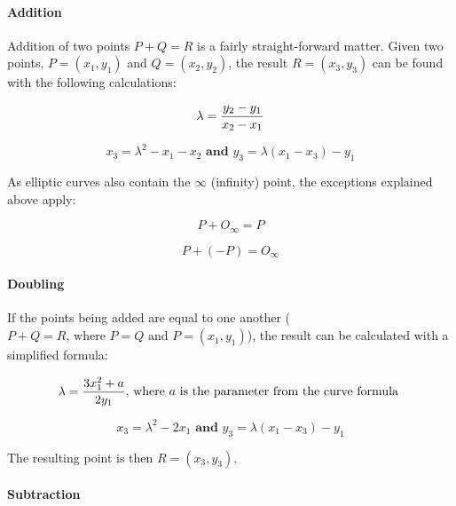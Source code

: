 \paragraph{Addition}

Addition of two points \(P + Q = R\) is a fairly straight-forward matter. Given two points, \(P = (x_1,y_1)\) and
\(Q = (x_2,y_2)\), the result \(R = (x_3,y_3)\) can be found with the following calculations:

\begin{equation}
	\lambda = {{y_2-y_1} \over {x_2-x_1}}
\end{equation}

\begin{equation}
	x_3 = \lambda^2 - x_1 - x_2 \textbf{ and } y_3 = \lambda (x_1 - x_3) - y_1
\end{equation}

As elliptic curves also contain the \(\infty\) (infinity) point, the exceptions explained above apply:

\begin{equation}
	P + O_\infty = P
\end{equation}

\begin{equation}
	P + (-P) = O_\infty
\end{equation}

\paragraph{Doubling}

If the points being added are equal to one another (\(P + Q = R \text{, where } P = Q \text{ and } P = (x_1,y_1)\)),
the result can be calculated with a simplified formula:

\begin{equation}
	\lambda = {{3x_1^2 + a} \over {2y_1}} \text{, where } a \text { is the parameter from the curve formula }
\end{equation}

\begin{equation}
	x_3 = \lambda^2 - 2x_1 \textbf{ and } y_3 = \lambda (x_1 - x_3) - y_1
\end{equation}

The resulting point is then \(R = (x_3, y_3)\).

\paragraph{Subtraction}

